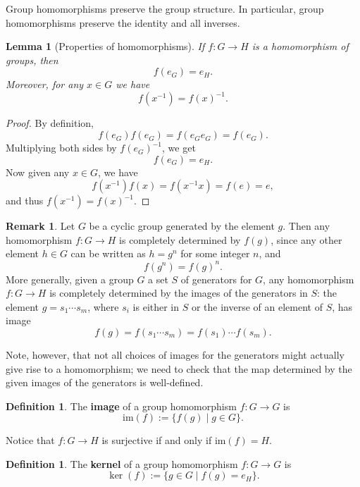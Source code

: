 \documentclass[12pt]{report}
\newtheorem{lemma}[theorem]{Lemma}
\numberwithin{equation}{section}
\numberwithin{theorem}{chapter}
\theoremstyle{definition}
\newtheorem{definition}[theorem]{Definition}
\newtheorem*{basic properties}{Basic Properties}
\newtheorem*{Important Remark}{Important Remark}
\newtheorem{remark}[theorem]{Remark}
\newcommand{\df}[1]{{\bf #1}\index{#1}}
\renewcommand{\ker}{\operatorname{ker}}
\begin{document}
Group homomorphisms preserve the group structure. In particular, group homomorphisms preserve the identity and all inverses.

\begin{lemma}[Properties of homomorphisms]\label{homomorphisms send 1 to 1}
	If $f: G \to H$ is a homomorphism of groups, then 
	$$f(e_G) = e_H.$$
	Moreover, for any $x \in G$ we have
	$$f(x^{-1}) = f(x)^{-1}.$$
\end{lemma}


\begin{proof}
By definition,
$$f(e_G)f(e_G) = f(e_Ge_G) = f(e_G).$$ 
Multiplying both sides by $f(e_G)^{-1}$, we get
$$f(e_G) = e_H.$$
Now given any $x \in G$, we have
$$f(x^{-1}) f(x) = f(x^{-1}x) = f(e) = e,$$ 
and thus $f(x^{-1}) = f(x)^{-1}$.
\end{proof}



\begin{remark}\label{homomorphism determined by generators}
Let $G$ be a cyclic group generated by the element $g$. Then any homomorphism $f\!: G \to H$ is completely determined by $f(g)$, since any other element $h \in G$ can be written as $h = g^n$ for some integer $n$, and
$$f(g^n) = f(g)^n.$$
More generally, given a group $G$ a set $S$ of generators for $G$, any homomorphism $f\!: G \longrightarrow H$ is completely determined by the images of the generators in $S$: the element $g = s_1 \cdots s_m$, where $s_i$ is either in $S$ or the inverse of an element of $S$, has image
$$f(g) = f(s_1 \cdots s_m) = f(s_1) \cdots f(s_m).$$

Note, however, that not all choices of images for the generators might actually give rise to a homomorphism; we need to check that the map determined by the given images of the generators is well-defined.
\end{remark}


\begin{definition}\index{$\ker(f)$}
The \df{image} of a group homomorphism $f\!: G \longrightarrow G$ is 
$$\mathrm{im}(f) := \{f(g) \mid g \in G \}.$$
\end{definition}

Notice that $f\!: G \to H$ is surjective if and only if $\mathrm{im}(f) = H$.


\begin{definition}\index{$\ker(f)$}
The \df{kernel} of a group homomorphism $f\!: G \longrightarrow G$ is 
$$\ker(f) := \{g \in G \mid f(g) = e_H\}.$$
\end{definition}
\end{document}
